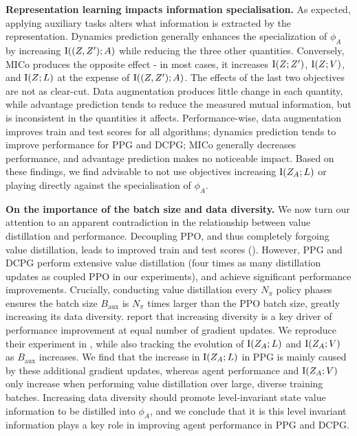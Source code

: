 \textbf{Representation learning impacts information specialisation.} As expected, applying auxiliary tasks alters what information is extracted by the representation. Dynamics prediction generally enhances the specialization of $\phi_A$ by increasing $\text{I}((Z,Z');A)$ while reducing the three other quantities. Conversely, MICo produces the opposite effect - in most cases, it increases $\text{I}(Z;Z')$, $\text{I}(Z;V)$, and $\text{I}(Z;L)$ at the expense of $\text{I}((Z,Z');A)$. The effects of the last two objectives are not as clear-cut. Data augmentation produces little change in each quantity, while advantage prediction tends to reduce the measured mutual information, but is inconsistent in the quantities it affects. Performance-wise, data augmentation improves train and test scores for all algorithms; dynamics prediction tends to improve performance for PPG and DCPG; MICo generally decreases performance, and advantage prediction makes no noticeable impact. Based on these findings, we find advisable to not use objectives increasing $\text{I}(Z_A;L)$ or playing directly against the specialisation of $\phi_A$.

\textbf{On the importance of the batch size and data diversity.} We now turn our attention to an apparent contradiction in the relationship between value distillation and performance. Decoupling PPO, and thus completely forgoing value distillation, leads to improved train and test scores (). However, PPG and DCPG perform extensive value distillation (four times as many distillation updates as coupled PPO in our experiments), and achieve significant performance improvements. Crucially, conducting value distillation every $N_\pi$ policy phases ensures the batch size $B_\text{aux}$ is $N_\pi$ times larger than the PPO batch size, greatly increasing its data diversity. \citet{KaixinPPG} report that increasing diversity is a key driver of performance improvement at equal number of gradient updates. We reproduce their experiment in , while also tracking the evolution of $\text{I}(Z_A;L)$ and $\text{I}(Z_A;V)$ as $B_\text{aux}$ increases. We find that the increase in $\text{I}(Z_A;L)$ in PPG is mainly caused by these additional gradient updates, whereas agent performance and $\text{I}(Z_A;V)$ only increase when performing value distillation over large, diverse training batches. Increasing data diversity should promote level-invariant state value information to be distilled into $\phi_A$, and we conclude that it is this level invariant information plays a key role in improving agent performance in PPG and DCPG.

